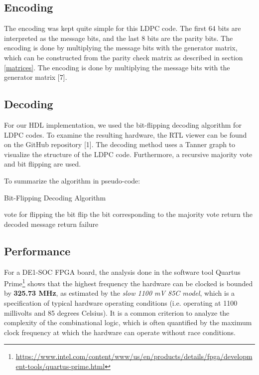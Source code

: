 \documentclass[conference]{IEEEtran}
\begin{document}
\subsection{Encoding}
The encoding was kept quite simple for this LDPC code.
The first 64 bits are interpreted as the message bits, and the last 8 bits are the parity bits.
The encoding is done by multiplying the message bits with the generator matrix, which can be constructed from the parity check matrix as described in section \ref{matrices}.
The encoding is done by multiplying the message bits with the generator matrix [7].
\subsection{Decoding}
For our HDL implementation, we used the bit-flipping decoding algorithm for LDPC codes.
To examine the resulting hardware, the RTL viewer can be found on the GitHub repository [1]. 
The decoding method uses a Tanner graph to visualize the structure of the LDPC code.
Furthermore, a recursive majority vote and bit flipping are used.

To summarize the algorithm in pseudo-code:
\begin{algorithm}
  \caption{Bit-Flipping Decoding Algorithm}
  \begin{algorithmic}
          \STATE vote for flipping the bit
        \ELSE
        \ENDIF
      \ENDFOR
      \STATE flip the bit corresponding to the majority vote
    \ENDWHILE
    \STATE return the decoded message
    \ELSE
    \STATE return failure
    \ENDIF
  \end{algorithmic}
\end{algorithm}

\subsection{Performance}
For a DE1-SOC FPGA board, the analysis done in the software tool Quartus Prime\footnote{\url{https://www.intel.com/content/www/us/en/products/details/fpga/development-tools/quartus-prime.html}} shows that the highest frequency the hardware can be clocked is bounded by \textbf{325.73 MHz}, as estimated by the \textit{slow 1100 mV 85C model}, which is a specification of typical hardware operating conditions (i.e. operating at 1100 millivolts and 85 degrees Celsius).
It is a common criterion to analyze the complexity of the combinational logic, which is often quantified by the maximum clock frequency at which the hardware can operate without race conditions.
\end{document}
